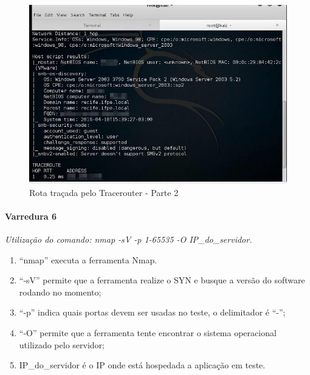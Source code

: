 \documentclass[
    12pt,               %
    openright,          %
    oneside,            %
    a4paper,            %
    section=TITLE,     %
    english,            %
    french,             %
    spanish,            %
    brazil              %
    ]{abntex2}
\begin{document}
\begin{figure}[htp]
\centering
\caption{Rota traçada pelo Tracerouter - Parte 2}
\includegraphics[width=450px]{image8.jpeg}
\end{figure}
\ifdefined\FloatBarrier \FloatBarrier \fi






\paragraph*{Varredura 6}

\emph{Utilização do comando: nmap -sV -p 1-65535 -O IP\_do\_servidor.}



\begin{enumerate}[start=1]
	
\item \textquotedblleft{}nmap\textquotedblright{} executa a ferramenta Nmap.
	
\item \textquotedblleft{}-sV\textquotedblright{} permite que a ferramenta realize o SYN e busque a versão do software rodando no momento;
	
\item \textquotedblleft{}-p\textquotedblright{} indica quais portas devem ser usadas no teste, o delimitador é \textquotedblleft{}-\textquotedblright{};
	
\item \textquotedblleft{}-O\textquotedblright{} permite que a ferramenta tente encontrar o sistema operacional utilizado pelo servidor;
	
\item IP\_do\_servidor é o IP onde está hospedada a aplicação em teste.

\end{enumerate}
\end{document}
